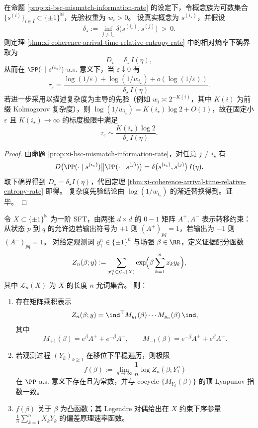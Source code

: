 \begin{corollary}\label{cor:xi-holographic-coherence-time-godel-penalty}
在命题 \ref{prop:xi-bsc-mismatch-information-rate} 的设定下，令概念族为可数集合 \(\{s^{(i)}\}_{i\in I}\subset\{\pm1\}^{\mathbb N}\)，先验权重为 \(w_i>0\)。
设真实概念为 \(s^{(i_\star)}\)，并假设
\[
\delta_\star:=\inf_{j\neq i_\star}\delta\bigl(s^{(i_\star)},s^{(j)}\bigr)\ >\ 0.
\]
则定理 \ref{thm:xi-coherence-arrival-time-relative-entropy-rate} 中的相对熵率下确界取为
\[
D_\star=\delta_\star\,I(\eta),
\]
从而在 \(\PP(\cdot\mid s^{(i_\star)})\)-a.s. 意义下，当 \(\varepsilon\downarrow 0\) 有
\[
\tau_\varepsilon
=\frac{\log(1/\varepsilon)+\log(1/w_{i_\star})+o(\log(1/\varepsilon))}{\delta_\star\,I(\eta)}.
\]
若进一步采用以描述复杂度为主导的先验（例如 \(w_i\asymp 2^{-K(i)}\)，其中 \(K(i)\) 为前缀 Kolmogorov 复杂度），则 \(\log(1/w_{i_\star})=K(i_\star)\log 2+O(1)\)，故在固定小 \(\varepsilon\) 且 \(K(i_\star)\to\infty\) 的标度极限中满足
\[
\tau_\varepsilon\sim \frac{K(i_\star)\log 2}{\delta_\star\,I(\eta)}.
\]
\end{corollary}

\begin{proof}
由命题 \ref{prop:xi-bsc-mismatch-information-rate}，对任意 \(j\neq i_\star\) 有
\[
D\bigl(\PP(\cdot\mid s^{(i_\star)})\big\|\PP(\cdot\mid s^{(j)})\bigr)
=\delta\bigl(s^{(i_\star)},s^{(j)}\bigr)\,I(\eta).
\]
取下确界得到 \(D_\star=\delta_\star I(\eta)\)，代回定理 \ref{thm:xi-coherence-arrival-time-relative-entropy-rate} 即得。
复杂度先验结论由 \(\log(1/w_{i_\star})\) 的渐近替换得到。证毕。
\end{proof}

\begin{theorem}\label{thm:xi-leyang-evidence-ising-lyapunov}
令 \(X\subset\{\pm1\}^{\mathbb N}\) 为一阶 SFT，由两张 \(d\times d\) 的 \(0\!-\!1\) 矩阵 \(A^{+},A^{-}\) 表示转移约束：从状态 \(p\) 到 \(q\) 的允许边若输出符号为 \(+1\) 则 \((A^{+})_{pq}=1\)，若输出为 \(-1\) 则 \((A^{-})_{pq}=1\)。
对给定观测词 \(y_1^n\in\{\pm1\}^n\) 与场强 \(\beta\in\RR\)，定义证据配分函数
\[
Z_n(\beta;y):=\sum_{x_1^n\in\mathcal L_n(X)}\exp\!\Bigl(\beta\sum_{k=1}^n x_k y_k\Bigr),
\]
其中 \(\mathcal L_n(X)\) 为 \(X\) 的长度 \(n\) 允词集合。
则：
\begin{enumerate}
  \item 存在矩阵乘积表示
  \[
  Z_n(\beta;y)=\ind^\top M_{y_1}(\beta)\cdots M_{y_n}(\beta)\,\ind,
  \]
  其中
  \[
  M_{+1}(\beta)=e^{\beta}A^{+}+e^{-\beta}A^{-},
  \qquad
  M_{-1}(\beta)=e^{-\beta}A^{+}+e^{\beta}A^{-}.
  \]
  \item 若观测过程 \((Y_k)_{k\ge 1}\) 在移位下平稳遍历，则极限
  \[
  f(\beta):=\lim_{n\to\infty}\frac1n\log Z_n(\beta;Y_1^n)
  \]
  在 \(\PP\)-a.s. 意义下存在且为常数，并与 cocycle \(\{M_{Y_k}(\beta)\}\) 的顶 Lyapunov 指数一致。
  \item \(f(\beta)\) 关于 \(\beta\) 为凸函数；其 Legendre 对偶给出在 \(X\) 约束下序参量 \(\frac1n\sum_{k=1}^n X_kY_k\) 的偏差原理速率函数。
\end{enumerate}
\end{theorem}

